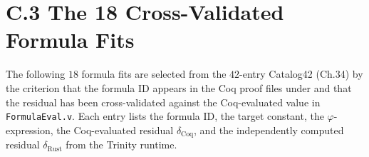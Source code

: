 \section*{C.3 The 18 Cross-Validated Formula Fits}
\label{app:C-formula-fits}

The following $18$ formula fits are selected from the $42$-entry
Catalog42 (Ch.34) by the criterion that the formula ID appears in the
Coq proof files under  and that the
residual has been cross-validated against the Coq-evaluated value in
\texttt{FormulaEval.v}. Each entry lists the formula ID, the target
constant, the $\varphi$-expression, the Coq-evaluated residual
$\delta_{\mathrm{Coq}}$, and the independently computed residual
$\delta_{\mathrm{Rust}}$ from the Trinity runtime.


